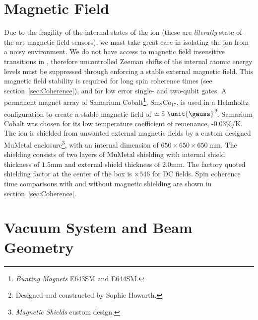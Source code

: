 \section{Magnetic Field}
\label{sec:Magnetic Field}
    Due to the fragility of
    the internal states of the ion (these are \textit{literally}
    state-of-the-art magnetic field sensors), we must take great care in
    isolating the ion from a noisy
    environment.
    We do not have access to magnetic field insensitive transitions in \ca , therefore uncontrolled Zeeman shifts of the internal atomic energy levels must be suppressed through enforcing a stable external magnetic field. This magnetic field stability is required for long spin
    coherence times (see section~\ref{sec:Coherence}), and for low error single-
    and two-qubit gates. A permanent magnet array of Samarium Cobalt\footnote{\emph{Bunting Magnets} E643SM and E644SM.},
    Sm$_2$Co$_{17}$, is used in a Helmholtz configuration to create a stable magnetic
    field of $\simeq 5~\unit{\gauss}$\footnote{Designed and constructed by Sophie Howarth.}. Samarium Cobalt was chosen for its low temperature
    coefficient of remenance, -0.03\%/K.\\
    The ion is shielded from unwanted external magnetic fields by a custom designed MuMetal enclosure\footnote{\emph{Magnetic Shields} custom
    design.}, with an internal dimension of $650\times 650\times 650~\unit{\milli\meter}$. The shielding consists of two layers of
    MuMetal shielding with internal shield thickness of $1.5\unit{\milli\meter}$ and external shield thickness of $2.0\unit{\milli\meter}$. The factory quoted
    shielding factor at the center of the box is
    $\times 546$ for DC fields. Spin coherence time comparisons with and without
    magnetic shielding are shown in
    section~\ref{sec:Coherence}.\\

\section{Vacuum System and Beam Geometry}
\label{sec:Vacuum System}



